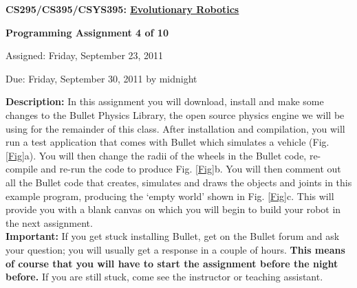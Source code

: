 \documentclass[12pt]{article}
\begin{document}
\centerline{\bf \Large CS295/CS395/CSYS395: \href{CS295_395_Syllabus.pdf}{\underline{Evolutionary Robotics}}}

\vspace{0.5cm}

\centerline{\bf \large Programming Assignment 4 of 10}

\vspace{0.5cm}

\centerline{\large Assigned: Friday, September 23, 2011}

\vspace{0.5cm}

\centerline{\large Due: Friday, September 30, 2011 by midnight}

\vspace{0.5cm}

\noindent \textbf{Description:} In this assignment you will download, install and make some changes to the Bullet Physics Library, the open source physics engine we will be using for the remainder of this class. After installation and compilation, you will run a test application that comes with Bullet which simulates a vehicle (Fig. \ref{Fig}a). You will then change the radii of the wheels in the Bullet code, re-compile and re-run the code to produce Fig. \ref{Fig}b. You will then comment out all the Bullet code that creates, simulates and draws the objects and joints in this example program, producing the `empty world' shown in Fig. \ref{Fig}c. This will provide you with a blank canvas on which you will begin to build your robot in the next assignment. \\

\noindent \textbf{Important:} If you get stuck installing Bullet, get on the Bullet forum and ask your question; you will usually get a response in a couple of hours. \textbf{This means of course that you will have to start the assignment before the night before.} If you are still stuck, come see the instructor or teaching assistant.
\end{document}
